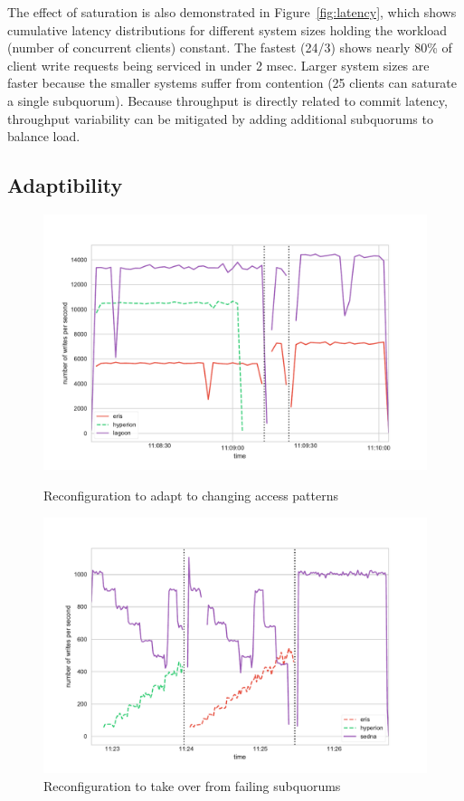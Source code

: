 \documentclass[11pt,conference]{IEEEtran}
\begin{document}
The effect of saturation is also demonstrated in Figure~\ref{fig:latency}, which shows 
cumulative latency distributions for different system sizes holding the  workload 
(number of concurrent clients) constant.
The fastest (24/3) shows nearly 80\% of client write requests being serviced in under 
2 msec.
Larger system sizes are faster because the smaller systems suffer from contention (25 
clients can saturate a single subquorum).
Because throughput is directly related to commit latency, throughput variability can be 
mitigated by adding additional subquorums to balance load.

\subsection{Adaptibility}

\begin{figure}[t]
    \centering
        \includegraphics[width=\linewidth]{figures/umd_fault_tolerance.pdf}
        \caption{Reconfiguration to adapt to changing access patterns}
        \label{fig:fault_tolerance}
    \endminipage\hfill
        \includegraphics[width=\linewidth]{figures/umd_sawtooth.pdf}
        \caption{Reconfiguration to take over from failing subquorums}
        \label{fig:sawtooth}
    \endminipage
\end{figure}
\end{document}
